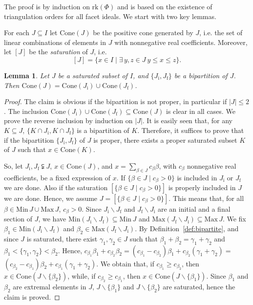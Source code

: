\documentclass[10pt]{amsart}
\newtheorem{lem}[thm]{Lemma}
\theoremstyle{definition}
\theoremstyle{remark}
\newcommand\smeno{\smallsetminus}
\newcommand\cone{\mathrm{Cone}}
\newcommand\Min{\mathrm{Min}}
\newcommand\Max{\mathrm{Max}}
\newcommand\rk{\mathrm{rk}}
\newcommand\be{\beta}
\newcommand\ga{\gamma}
\renewcommand{\leq}{\leqslant}
\begin{document}
The proof is by induction on $\rk(\Phi)$ and is based on the existence of triangulation orders for all facet ideals. 
We start with two key lemmas. 

\par
For each $J\subseteq I$ let $\cone(J)$ be the positive cone generated by $J$, i.e. the set of linear combinations of elements in $J$ with nonnegative real coefficients.
Moreover, let $[J]$ be the {\it saturation} of $J$, i.e. 
$$[J]=\{x\in I\mid \exists\, y,z\in J\ y\leq x\leq z\}.$$ 


\begin{lem}\label{lem:coni-bipartite}
Let $J$ be a saturated subset of $I$, and  $\{J_{\mathrm i},J_{\mathrm f}\}$ be a  bipartition of $J$.
Then $\cone(J)=\cone(J_{\mathrm i})\cup \cone(J_{\mathrm f})$. 
\end{lem}

\begin{proof}
The claim is obvious if the bipartition is not proper, in particular if $|J|\leq 2$. 
The inclusion $\cone(J_{\mathrm i})\cup \cone(J_{\mathrm f})\subseteq \cone(J)$ is clear in all cases.
We prove the reverse inclusion by induction on $|J|$. 
It is easily seen that, for any $K\subseteq J$, $\{K\cap J_{\mathrm i}, K\cap J_{\mathrm f}\}$ is a bipartition of $K$.  
Therefore, it suffices to prove that if the bipartition $\{J_{\mathrm i},J_{\mathrm f}\}$ of $J$ is proper,  there exists a proper saturated subset $K$ of $J$ such that $x\in \cone(K)$. 
\par

So, let $J_{\mathrm i}, J_{\mathrm f}\subsetneqq J$, $x\in \cone(J)$, and $x=\sum\limits_{\be\in J}c_\be\be$,  with $c_\be$ nonnegative real coefficients, be a fixed expression of $x$.
If $\{\be\in J\mid c_\be> 0\}$ is included in $J_{\mathrm i}$ or $J_{\mathrm f}$ we are done.
Also if the saturation $[\{\be\in J\mid c_\be> 0\}]$ is properly included in $J$ we are done.
Hence, we assume  $J=[\{\be\in J\mid c_\be> 0\}]$. 
This means that, for all $\be\in \Min\, J\cup  \Max\, J$, $c_\be> 0$.
Since $J_{\mathrm i}\smeno J_{\mathrm f}$ and $J_{\mathrm f}\smeno J_{\mathrm i}$ are an initial and a final section of $J$, we have  $\Min(J_{\mathrm i}\smeno J_{\mathrm f})\subseteq \Min\, J$ and $\Max(J_{\mathrm f}\smeno J_{\mathrm i})\subseteq \Max\, J$.
We fix  $\be_1\in \Min (J_{\mathrm i}\smeno J_{\mathrm f})$ and $\be_2\in \Max(J_{\mathrm f}\smeno J_{\mathrm i})$.
By Definition~\ref{def:bipartite}, and since $J$ is saturated, there exist $\ga_1, \ga_2\in J$  such that $\be_1+\be_2=\ga_1+\ga_2$ and $\be_1< \{\ga_1, \ga_2\}< \be_2$. 
Hence, $c_{\be_1}\be_1+ c_{\be_2} \be_2=(c_{\be_1}-c_{\be_2}) \be_1 + c_{\be_2} (\ga_1+\ga_2) =$ $(c_{\be_2}-c_{\be_1}) \be_2 + c_{\be_1} (\ga_1+\ga_2)$.
We obtain that, if  $c_{\be_1}\geq  c_{\be_2}$, then $x\in \cone (J \smeno\{\be_2\})$, while, if  $c_{\be_2}\geq  c_{\be_1}$, then $x\in \cone (J \smeno\{\be_1\})$. 
Since $\be_1$ and $\be_2$ are extremal elements in $J$, $J \smeno\{\be_1\}$ and $J \smeno\{\be_2\}$ are saturated, hence the claim is proved.
\end{proof}
\end{document}

